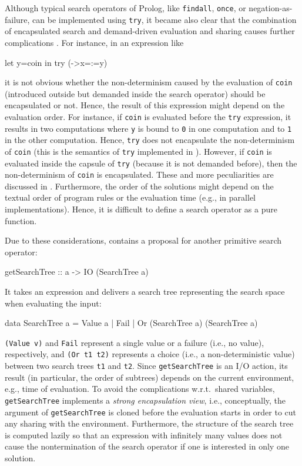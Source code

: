 \documentclass[english]{lni}
\newcommand{\code}[1]{\texttt{\small{}#1}}
\begin{document}
Although typical search operators of Prolog,
like \code{findall}, \code{once}, or negation-as-failure,
can be implemented using \code{try},
it became also clear that the combination of
encapsulated search and demand-driven evaluation
and sharing causes further complications \cite{BrasselHanusHuch04JFLP}.
For instance, in an expression like
\begin{curry}
let y=coin in try (\x->x=:=y)
\end{curry}
it is not obvious whether the non-determinism caused by the evaluation
of \code{coin} (introduced outside
but demanded inside the search operator) should be encapsulated or not.
Hence, the result of this expression might depend on the evaluation order.
For instance,
if \code{coin} is evaluated before the \code{try} expression,
it results in two computations where \code{y} is bound to \code{0}
in one computation and to \code{1} in the other computation.
Hence, \code{try} does not encapsulate the non-determinism of \code{coin}
(this is the semantics of \code{try} implemented in \cite{Lux99FLOPS}).
However, if \code{coin} is evaluated inside the capsule of \code{try}
(because it is not demanded before), then the non-determinism of
\code{coin} is encapsulated.
These and more peculiarities are discussed in \cite{BrasselHanusHuch04JFLP}.
Furthermore, the order of the solutions might depend on the
textual order of program rules or the evaluation time
(e.g., in parallel implementations).
Hence, it is difficult to define a search operator as a pure function.

Due to these considerations,
\cite{BrasselHanusHuch04JFLP} contains a proposal
for another primitive search operator:
\begin{curry}
getSearchTree :: a -> IO (SearchTree a)
\end{curry}
It takes an expression and delivers a search tree representing
the search space when evaluating the input:
\begin{curry}
data SearchTree a = Value a
                  | Fail
                  | Or (SearchTree a) (SearchTree a)
\end{curry}
\code{(Value v)} and \code{Fail} represent a single value
or a failure (i.e., no value), respectively,
and \code{(Or t1 t2)} represents a choice (i.e., a non-deterministic value)
between two search trees \code{t1} and \code{t2}.
Since \code{getSearchTree} is an I/O action, its result (in particular,
the order of subtrees) depends on the current environment, e.g.,
time of evaluation.
To avoid the complications w.r.t.\ shared variables,
\code{getSearchTree} implements a \emph{strong encapsulation view},
i.e., conceptually, the argument of \code{getSearchTree}
is cloned before the evaluation starts in order to cut any sharing
with the environment.
Furthermore, the structure of the search tree is computed lazily
so that an expression with infinitely many values does not cause
the nontermination of the search operator if one is interested in only
one solution.
\end{document}
